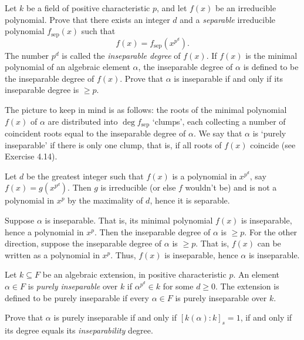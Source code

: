 \documentclass[../../master.tex]{subfiles}
\begin{document}
\begin{problem}
    Let $k$ be a field of positive characteristic $p$, and let $f(x)$ be an irreducible polynomial.
    Prove that there exists an integer $d$ and a \textit{separable} irreducible polynomial $f_{\text{sep}}(x)$ such that
    \[
        f(x) = f_{\text{sep}}(x^{p^{d}}).
    \]
    The number $p^{d}$ is called the \textit{inseparable degree} of $f(x)$.
    If $f(x)$ is the minimal polynomial of an algebraic element $\alpha$, the inseparable degree of $\alpha$ is defined to be the inseparable degree of $f(x)$.
    Prove that $\alpha$ is inseparable if and only if its inseparable degree is $\geq p$.

    The picture to keep in mind is as follows:
    the roots of the minimal polynomial $f(x)$ of $\alpha$ are distributed into $\deg f_{\text{sep}}$ `clumps', each collecting a number of coincident roots equal to the inseparable degree of $\alpha$.
    We say that $\alpha$ is `purely inseparable' if there is only one clump, that is, if all roots of $f(x)$ coincide (see Exercise 4.14).
\end{problem}

\begin{solution}
    Let $d$ be the greatest integer such that $f(x)$ is a polynomial in $x^{p^{d}}$, say $f(x) = g(x^{p^{d}})$.
    Then $g$ is irreducible (or else $f$ wouldn't be) and is not a polynomial in $x^{p}$ by the maximality of $d$, hence it is separable.

    Suppose $\alpha$ is inseparable.
    That is, its minimal polynomial $f(x)$ is inseparable, hence a polynomial in $x^{p}$.
    Then the inseparable degree of $\alpha$ is $\geq p$.
    For the other direction, suppose the inseparable degree of $\alpha$ is $\geq p$.
    That is, $f(x)$ can be written as a polynomial in $x^{p}$.
    Thus, $f(x)$ is inseparable, hence $\alpha$ is inseparable.
\end{solution}

\begin{problem}
    Let $k \subseteq F$ be an algebraic extension, in positive characteristic $p$.
    An element $\alpha \in F$ is \textit{purely inseparable} over $k$ if $\alpha^{p^{d}} \in k$ for some $d \geq 0$.
    The extension is defined to be purely inseparable if every $\alpha \in F$ is purely inseparable over $k$.

    Prove that $\alpha$ is purely inseparable if and only if $[k(\alpha) : k]_s = 1$, if and only if its degree equals its \textit{inseparability} degree.
\end{problem}
\end{document}
